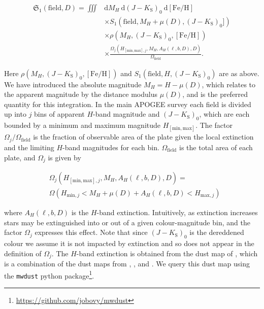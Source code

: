 \begin{equation}
\label{eq:effective-selection-function}
\begin{split}
\mathfrak{S}_{1}(\mathrm{field},D) = \iiint & \mathrm{d} M_{H}\ \mathrm{d} (J-K_\mathrm{S})_{0}\ \mathrm{d} [\mathrm{Fe/H}] \\
& \times S_{1}(\mathrm{field}, M_{H}+\mu(D), (J-K_\mathrm{S})_{0}]) \\
& \times \rho(M_{H},(J-K_\mathrm{S})_{0}, [\mathrm{Fe/H}]) \\
& \times \frac{\Omega_{j}(H_{[\mathrm{min},\mathrm{max}],j},M_{H},A_{H}(\ell,b,D),D)}{\Omega_\mathrm{field}}.
\end{split}
\end{equation}

Here $\rho(M_{H},(J-K_\mathrm{S})_{0},[\mathrm{Fe/H}])$ and $S_{1}(\mathrm{field}, H, (J-K_\mathrm{S})_{0})$ are as above. We have introduced the absolute magnitude $M_{H} = H - \mu(D)$, which relates to the apparent magnitude by the distance modulus $\mu(D)$, and is the preferred quantity for this integration. In the main APOGEE survey each field is divided up into $j$ bins of apparent ${H}$-band magnitude and $(J-K_\mathrm{S})_{0}$, which are each bounded by a minimum and maximum magnitude $H_{[\mathrm{min},\mathrm{max}]}$. The factor $\Omega_{j}/\Omega_\mathrm{field}$ is the fraction of observable area of the plate given the local extinction and the limiting $H$-band magnitudes for each bin. $\Omega_\mathrm{field}$ is the total area of each plate, and $\Omega_{j}$ is given by

\begin{equation}
\begin{split}
& \Omega_{j}(H_{[\mathrm{min},\mathrm{max}],j},M_{H},A_{H}(\ell,b,D),D) = \\
& \Omega(H_{\mathrm{min},j} < M_{H}+\mu(D)+A_{H}(\ell,b,D) < H_{\mathrm{max},j} )
\end{split}
\end{equation}

\noindent where $A_{H}(\ell,b,D)$ is the $H$-band extinction. Intuitively, as extinction increases stars may be extinguished into or out of a given colour-magnitude bin, and the factor $\Omega_{j}$ expresses this effect. Note that since $(J-K_\mathrm{S})_{0}$ is the dereddened colour we assume it is not impacted by extinction and so does not appear in the definition of $\Omega_{j}$. The $H$-band extinction is obtained from the dust map of \textcite{bovy16a}, which is a combination of the dust maps from \textcite{marshall06}, \textcite{green15}, and \textcite{drimmel03}. We query this dust map using the \texttt{mwdust} python package\footnote{\url{https://github.com/jobovy/mwdust}}.

